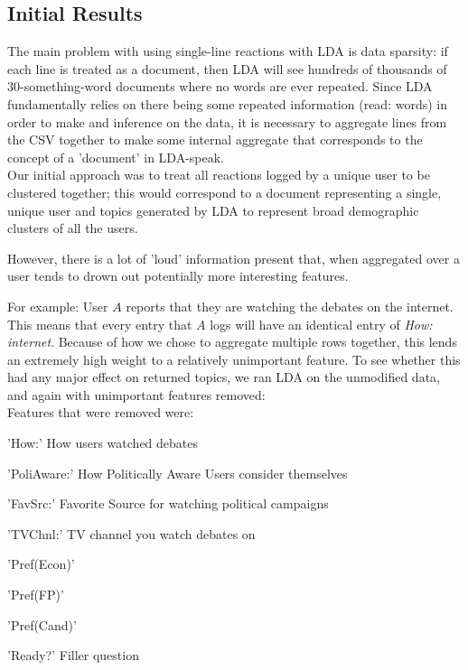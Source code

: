\subsection{Initial Results}
The main problem with using single-line reactions with LDA is data sparsity: if each line is treated as a document, then LDA will see hundreds of thousands of 30-something-word documents where no words are ever repeated. Since LDA fundamentally relies on there being some repeated information (read: words) in order to make and inference on the data, it is necessary to aggregate lines from the CSV together to make some internal aggregate that corresponds to the concept of a 'document' in LDA-speak.\\

Our initial approach was to treat all reactions logged by a unique user to be clustered together; this would correspond to a document representing a single, unique user and topics generated by LDA to represent broad demographic clusters of all the users.

However, there is a lot of 'loud' information present that, when aggregated over a user tends to drown out potentially more interesting features.

For example: User $A$ reports that they are watching the debates on the internet. This means that every entry that $A$ logs will have an identical entry of \emph{How: internet}. Because of how we chose to aggregate multiple rows together, this lends an extremely high weight to a relatively unimportant feature. To see whether this had any major effect on returned topics, we ran LDA on the unmodified data, and again with unimportant features removed:\\



Features that were removed were:
\begin{list}
\item 'How:' How users watched debates
\item 'PoliAware:' How Politically Aware Users consider themselves
\item 'FavSrc:' Favorite Source for watching political campaigns
\item 'TVChnl:' TV channel you watch debates on
\item 'Pref(Econ)'
\item 'Pref(FP)'
\item 'Pref(Cand)'
\item 'Ready?' Filler question
\end{list}

